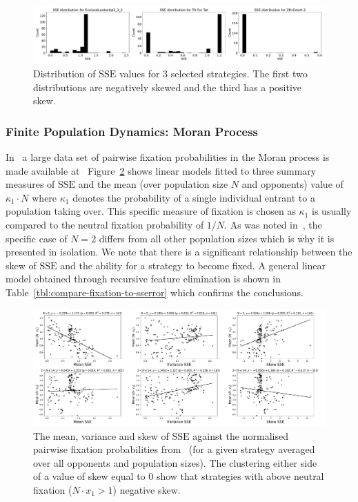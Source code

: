 \documentclass[a4paper]{article}
\newcommand{\SSe}{\text{SSE}}
\begin{document}
\begin{figure}[!hbtp]
    \centering
    \includegraphics[width=\textwidth]{./assets/img/sserror_distribution_for_selection_of_strategies/main.pdf}
    \caption{Distribution of \(\SSe\) values for 3 selected strategies. The
    first two distributions are negatively skewed and the third has a positive
    skew.}
    \label{fig:sserror_distribution_for_selection_of_strategies}
\end{figure}

\subsubsection{Finite Population Dynamics: Moran Process}

In~\cite{Moran1707} a large data set of pairwise fixation probabilities in the
Moran process is made available at~\cite{vincent_knight_2017_1040129}
Figure~\ref{fig:compare-fixation-to-sserror} shows linear models fitted to three
summary measures of \(\SSe\) and the mean (over population size \(N\) and
opponents) value of \(\kappa_1\cdot N\) where \(\kappa_1\) denotes the
probability of a single individual entrant to a population taking over. This
specific measure of fixation is chosen as \(\kappa_1\) is usually compared to
the neutral fixation probability of \(1 / N\).  As was noted
in~\cite{Moran1707}, the specific case of \(N=2\) differs from all other
population sizes which is why it is presented in isolation.  We note that there
is a significant relationship between the skew of \(\SSe\) and the ability for a
strategy to become fixed.  A general linear model obtained through recursive
feature elimination is shown in Table~\ref{tbl:compare-fixation-to-sserror}
which confirms the conclusions.

\begin{figure}[!hbtp]
    \centering
    \includegraphics[width=\textwidth]{./assets/img/compare-fixation-to-sserror/main.pdf}
    \caption{The mean, variance and skew of
    \(\SSe\) against the normalised pairwise fixation probabilities
    from~\cite{Moran1707} (for a given strategy averaged over all opponents and
    population sizes). The clustering either side of a value of skew equal to
    0 show that strategies with above neutral
    fixation (\(N\cdot x_1>1\)) negative skew.}
    \label{fig:compare-fixation-to-sserror}
\end{figure}
\end{document}
